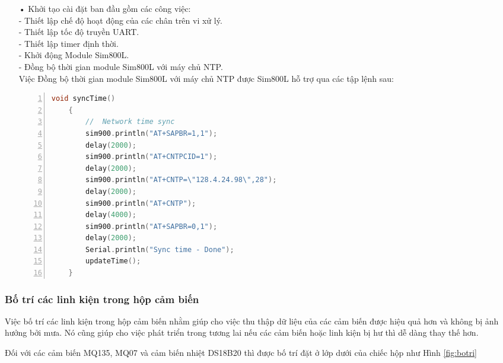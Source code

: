 \begin{itemize}
	\item[•]Khởi tạo cài đặt ban đầu gồm các công việc: \\
	- Thiết lập chế độ hoạt động của các chân trên vi xử lý.\\
	- Thiết lập tốc độ truyền UART.\\
	- Thiết lập timer định thời.\\
	- Khởi động Module Sim800L.\\
	- Đồng bộ thời gian module Sim800L với máy chủ NTP.\\
	Việc Đồng bộ thời gian module Sim800L với máy chủ NTP được Sim800L hỗ trợ qua các tập lệnh sau:
	\begin{lstlisting}[numbers=left,firstnumber=1,language=C]
	void syncTime()
	{
		//  Network time sync
		sim900.println("AT+SAPBR=1,1");
		delay(2000);
		sim900.println("AT+CNTPCID=1");
		delay(2000);
		sim900.println("AT+CNTP=\"128.4.24.98\",28");
		delay(2000);
		sim900.println("AT+CNTP");
		delay(4000);  
		sim900.println("AT+SAPBR=0,1");
		delay(2000);
		Serial.println("Sync time - Done");
		updateTime();
	}
	\end{lstlisting}
	
\end{itemize}



\subsubsection*{Bố trí các linh kiện trong hộp cảm biến}
Việc bố trí các linh kiện trong hộp cảm biến nhằm giúp cho việc thu thập dữ liệu của các cảm biến được hiệu quả hơn và không bị ảnh hưởng bởi mưa. Nó cũng giúp cho việc phát triển trong tương lai nếu các cảm biến hoặc linh kiện bị hư thì dễ dàng thay thế hơn.

Đối với các cảm biến MQ135, MQ07 và cảm biến nhiệt DS18B20 thì được bố trí đặt ở lớp dưới của chiếc hộp như Hình \ref{fig:botri}

